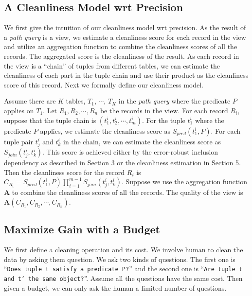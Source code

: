 \subsection{A Cleanliness Model wrt Precision}\label{subsec:model:precision}


We first give the intuition of our cleanliness model wrt precision. As the result of a \emph{path query} is a view, we estimate a cleanliness score for each record in the view and utilize an aggregation function to combine the cleanliness scores of all the records. The aggregated score is the cleanliness of the result. As each record in the view is a ``chain'' of tuples from different tables, we can estimate the cleanliness of each part in the tuple chain and use their product as the cleanliness score of this record. Next we formally define our cleanliness model.


Assume there are $K$ tables, $T_1$, $\cdots$, $T_K$ in the \emph{path query} where the predicate $P$ applies on $T_1$. Let $R_1, R_2, \cdots, R_n$ be the records in the view. For each record $R_i$, suppose that the tuple chain is $(t^i_1, t^i_2, \cdots, t^i_m)$. For the tuple $t^i_1$ where the predicate $P$ applies, we estimate the cleanliness score as $S_{pred}(t^i_1, P)$. For each tuple pair $t^i_j$ and $t^i_k$ in the chain, we can estimate the cleanliness score as $S_{join}(t^i_j,t^i_k)$. This score is achieved either by the error-robust inclusion dependency as described in Section 3 or the cleanliness estimation in Section 5. Then the cleanliness score for the record $R_i$ is $C_{R_i}=S_{pred}(t^i_1,P)\prod_{i=1}^{m-1}S_{join}(t^i_j,t^i_k)$. Suppose we use the aggregation function $\mathbf{A}$ to combine the cleanliness scores of all the records. The quality of the view is $\mathbf{A}(C_{R_1}, C_{R_2}, \cdots, C_{R_n})$.



\subsection{Maximize Gain with a Budget}\label{subsec:gain}

We first define a cleaning operation and its cost. We involve human to clean the data by asking them question. We ask two kinds of questions. The first one is ``\texttt{Does tuple t satisfy a predicate P?}'' and the second one is ``\texttt{Are tuple t and t' the same object?}''. Assume all the questions have the same cost. Then given a budget, we can only ask the human a limited number of questions.


